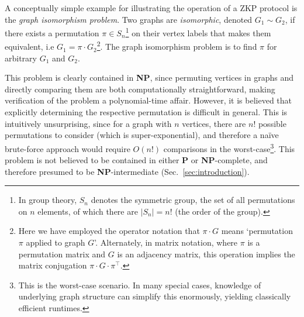 A conceptually simple example for illustrating the operation of a ZKP protocol is the \textit{graph isomorphism problem}. Two graphs are \textit{isomorphic}, denoted \mbox{$G_1\sim G_2$}, if there exists a permutation \mbox{$\pi\in S_n$}\footnote{In group theory, $S_n$ denotes the symmetric group, the set of all permutations on $n$ elements, of which there are \mbox{$|S_n|=n!$} (the order of the group).} on their vertex labels that makes them equivalent, i.e \mbox{$G_1=\pi\cdot G_2$}\footnote{Here we have employed the operator notation that \mbox{$\pi\cdot G$} means `permutation $\pi$ applied to graph $G$'. Alternately, in matrix notation, where $\pi$ is a permutation matrix and $G$ is an adjacency matrix, this operation implies the matrix conjugation \mbox{$\pi\cdot G\cdot\pi^\top$}.}. The graph isomorphism problem is to find $\pi$ for arbitrary $G_1$ and $G_2$.

This problem is clearly contained in \textbf{NP}, since permuting vertices in graphs and directly comparing them are both computationally straightforward, making verification of the problem a polynomial-time affair. However, it is believed that explicitly determining the respective permutation is difficult in general. This is intuitively unsurprising, since for a graph with $n$ vertices, there are $n!$ possible permutations to consider (which is super-exponential), and therefore a na{\" i}ve brute-force approach would require $O(n!)$ comparisons in the worst-case\footnote{This is the worst-case scenario. In many special cases, knowledge of underlying graph structure can simplify this enormously, yielding classically efficient runtimes.}. This problem is not believed to be contained in either \textbf{P} or \textbf{NP}-complete, and therefore presumed to be \textbf{NP}-intermediate (Sec.~\ref{sec:introduction}).

